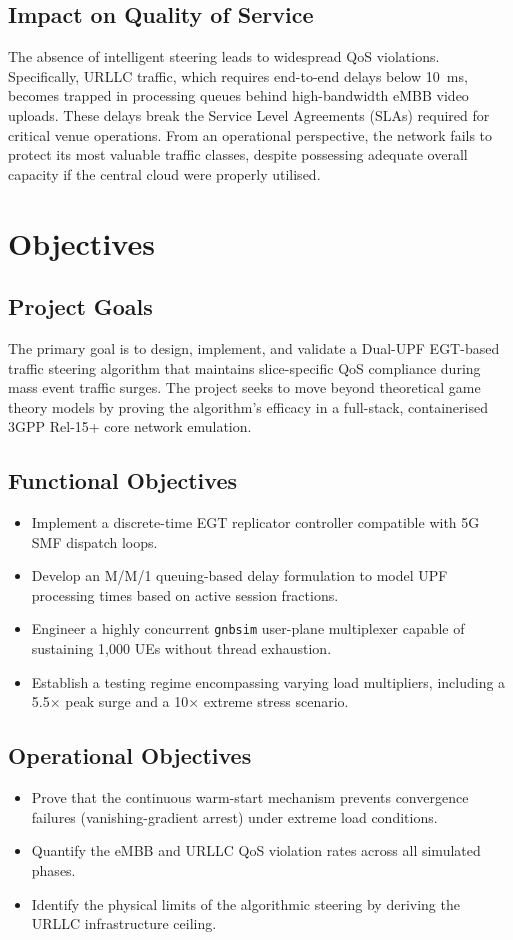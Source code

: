 \documentclass[11pt,a4paper,english]{article}
\begin{document}
\subsection{Impact on Quality of Service}
The absence of intelligent steering leads to widespread QoS violations. Specifically, URLLC traffic, which requires end-to-end delays below 10~ms, becomes trapped in processing queues behind high-bandwidth eMBB video uploads. These delays break the Service Level Agreements (SLAs) required for critical venue operations. From an operational perspective, the network fails to protect its most valuable traffic classes, despite possessing adequate overall capacity if the central cloud were properly utilised.

\section{Objectives}
\subsection{Project Goals}
The primary goal is to design, implement, and validate a Dual-UPF EGT-based traffic steering algorithm that maintains slice-specific QoS compliance during mass event traffic surges. The project seeks to move beyond theoretical game theory models by proving the algorithm's efficacy in a full-stack, containerised 3GPP Rel-15+ core network emulation.

\subsection{Functional Objectives}
\begin{itemize}
    \item Implement a discrete-time EGT replicator controller compatible with 5G SMF dispatch loops.
    \item Develop an M/M/1 queuing-based delay formulation to model UPF processing times based on active session fractions.
    \item Engineer a highly concurrent \texttt{gnbsim} user-plane multiplexer capable of sustaining 1,000 UEs without thread exhaustion.
    \item Establish a testing regime encompassing varying load multipliers, including a 5.5$\times$ peak surge and a 10$\times$ extreme stress scenario.
\end{itemize}

\subsection{Operational Objectives}
\begin{itemize}
    \item Prove that the continuous warm-start mechanism prevents convergence failures (vanishing-gradient arrest) under extreme load conditions.
    \item Quantify the eMBB and URLLC QoS violation rates across all simulated phases.
    \item Identify the physical limits of the algorithmic steering by deriving the URLLC infrastructure ceiling.
\end{itemize}
\end{document}
